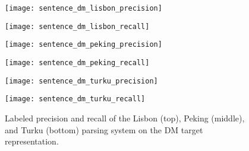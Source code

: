 \begin{figure}[h]
    \centering
    \begin{minipage}{0.50\textwidth}
        \centering
        \texttt{[image: sentence\_dm\_lisbon\_precision]}
    \end{minipage}\hfill
    \begin{minipage}{0.50\textwidth}
        \centering
        \texttt{[image: sentence\_dm\_lisbon\_recall]}
    \end{minipage}
    
    \begin{minipage}{0.50\textwidth}
        \centering
        \texttt{[image: sentence\_dm\_peking\_precision]}
    \end{minipage}\hfill
    \begin{minipage}{0.50\textwidth}
        \centering
        \texttt{[image: sentence\_dm\_peking\_recall]}
    \end{minipage}
    
    \begin{minipage}{0.50\textwidth}
        \centering
        \texttt{[image: sentence\_dm\_turku\_precision]}
    \end{minipage}\hfill
    \begin{minipage}{0.50\textwidth}
        \centering
        \texttt{[image: sentence\_dm\_turku\_recall]}
    \end{minipage}
    
    \caption{Labeled precision and recall of the Lisbon (top), Peking (middle), and Turku (bottom) parsing system on the DM target representation.}
    \label{fig:dm_s_length}
\end{figure}

